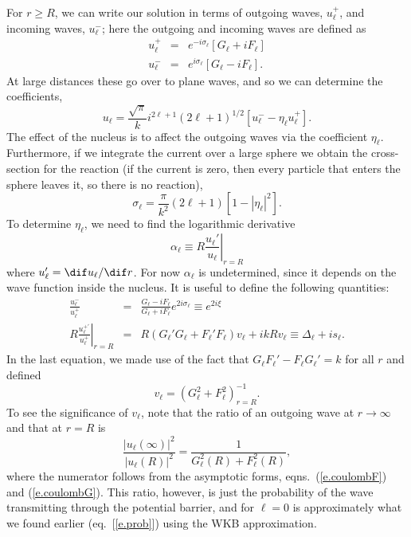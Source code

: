For $r \geq R$, we can write our solution in terms of outgoing waves, $u_{\ell}^{+}$, and incoming waves, $u_{\ell}^{-}$; here the outgoing and incoming waves are defined as 
\begin{eqnarray*}
u_{\ell}^{+} &=& e^{-i\sigma_{\ell}}\left[G_{\ell} + i F_{\ell}\right]\\
u_{\ell}^{-} &=& e^{i\sigma_{\ell}}\left[G_{\ell} - i F_{\ell}\right].
\end{eqnarray*}
At large distances these go over to plane waves,  and so we can determine the coefficients,
\begin{equation}\label{e.coulomb-solution}
u_{\ell} = \frac{\sqrt{\pi}}{k}i^{2\ell + 1}(2\ell +1)^{1/2}\left[u_{\ell}^{-} - \eta_{\ell}u_{\ell}^{+}\right].
\end{equation}
The effect of the nucleus is to affect the outgoing waves via the coefficient $\eta_{\ell}$.  Furthermore, if we integrate the current over a large sphere we obtain the cross-section for the reaction (if the current is zero, then every particle that enters the sphere leaves it, so there is no reaction),
\begin{equation}\label{e.cross-section-eta}
\sigma_{\ell} = \frac{\pi}{k^{2}}(2\ell +1) \left[ 1 - |\eta_{\ell}|^{2}\right].
\end{equation}
To determine $\eta_{\ell}$, we need to find the logarithmic derivative
\[
\alpha_{\ell} \equiv R\left.\frac{u_{\ell}'}{u_{\ell}}\right|_{r=R}
\]
where $u_{\ell}' = \dif u_{\ell}/\dif r$.  For now $\alpha_{\ell}$ is undetermined, since it depends on the wave function inside the nucleus.  It is useful to define the following quantities:
\begin{eqnarray}\label{e.coulombPhase}
\frac{u_{\ell}^{-}}{u_{\ell}^{+}} & = & \frac{G_{\ell} - i F_{\ell}}{G_{\ell} + i F_{\ell}}e^{2i\sigma_{\ell}} \equiv e^{2i\xi}\\
R\left.\frac{u_{\ell}^{+'}}{u_{\ell}^{+}}\right|_{r=R} &=& R(G_{\ell}'G_{\ell} + F_{\ell}'F_{\ell})v_{\ell} + i kR v_{\ell} \equiv \Delta_{\ell} + is_{\ell}.
\label{e.delta-s}
\end{eqnarray}
In the last equation, we made use of the fact that $G_{\ell}F_{\ell}' - F_{\ell}G_{\ell}' = k$ for all $r$ and defined
\[
v_{\ell} = \left(G_{\ell}^{2} + F_{\ell}^{2}\right)^{-1}_{r=R}.
\]
To see the significance of $v_{\ell}$, note that the ratio of an outgoing wave at $r\to\infty$ and that at $r=R$ is
\[
\frac{|u_{\ell}(\infty)|^{2}}{|u_{\ell}(R)|^{2}} = \frac{1}{G_{\ell}^{2}(R) + F_{\ell}^{2}(R)},
\]
where the numerator follows from the asymptotic forms, eqns.~(\ref{e.coulombF}) and (\ref{e.coulombG}). This ratio, however, is just the probability of the wave transmitting through the potential barrier, and for $\ell=0$ is approximately what we found earlier (eq.~[\ref{e.prob}]) using the WKB approximation.

